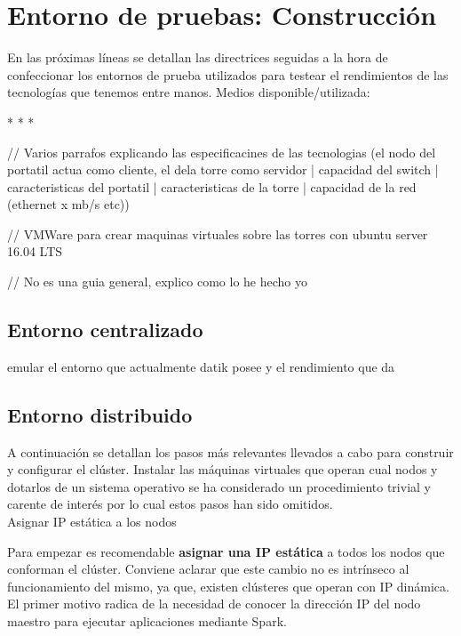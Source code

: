 
\pagestyle{fancy}

\chapter{Entorno de pruebas: Construcción}
\label{entorno_pruebas}

En las próximas líneas se detallan las directrices seguidas a la hora de confeccionar los entornos de prueba utilizados para testear el rendimientos de las tecnologías que tenemos entre manos. Medios disponible/utilizada:

*
*
*

// Varios parrafos explicando las especificacines de las tecnologias (el nodo del portatil actua como cliente, el dela torre como servidor | capacidad del switch | caracteristicas del portatil | caracteristicas de la torre | capacidad de la red (ethernet x mb/s etc))

// VMWare para crear maquinas virtuales sobre las torres con ubuntu server 16.04 LTS

// No es una guia general, explico como lo he hecho yo


\section{Entorno centralizado}

emular el entorno que actualmente datik posee y el rendimiento que da


\section{Entorno distribuido}

A continuación se detallan los pasos más relevantes llevados a cabo para construir y configurar el clúster. Instalar las máquinas virtuales que operan cual nodos y dotarlos de un sistema operativo se ha considerado un procedimiento trivial y carente de interés por lo cual estos pasos han sido omitidos.\\ 

Asignar IP estática a los nodos

Para empezar es recomendable \textbf{asignar una IP estática} a todos los nodos que conforman el clúster. Conviene aclarar que este cambio no es intrínseco al funcionamiento del mismo, ya que, existen clústeres que operan con IP dinámica. El primer motivo radica de la necesidad de conocer la dirección IP del nodo maestro para ejecutar aplicaciones mediante Spark.  

